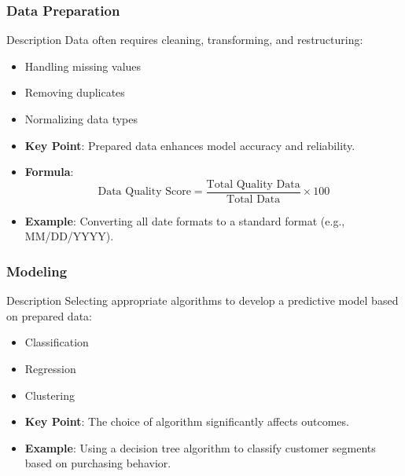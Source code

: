 \documentclass[aspectratio=169]{beamer}
\begin{document}
\begin{frame}[fragile]
    \frametitle{Data Preparation}
    \begin{block}{Description}
        Data often requires cleaning, transforming, and restructuring:
        \begin{itemize}
            \item Handling missing values
            \item Removing duplicates
            \item Normalizing data types
        \end{itemize}
    \end{block}
    \begin{itemize}
        \item \textbf{Key Point}: Prepared data enhances model accuracy and reliability.
        \item \textbf{Formula}:
        \begin{equation}
        \text{Data Quality Score} = \frac{\text{Total Quality Data}}{\text{Total Data}} \times 100
        \end{equation}
        \item \textbf{Example}: Converting all date formats to a standard format (e.g., MM/DD/YYYY).
    \end{itemize}
\end{frame}

\begin{frame}[fragile]
    \frametitle{Modeling}
    \begin{block}{Description}
        Selecting appropriate algorithms to develop a predictive model based on prepared data:
        \begin{itemize}
            \item Classification
            \item Regression
            \item Clustering
        \end{itemize}
    \end{block}
    \begin{itemize}
        \item \textbf{Key Point}: The choice of algorithm significantly affects outcomes.
        \item \textbf{Example}: Using a decision tree algorithm to classify customer segments based on purchasing behavior.
    \end{itemize}
\end{frame}
\end{document}
